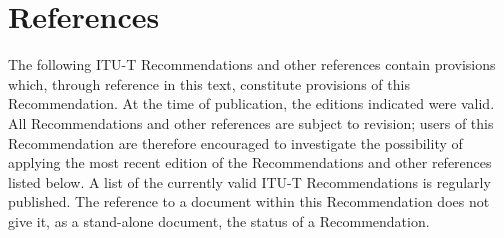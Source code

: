 \documentclass[a4paper,11pt]{article}
\begin{document}
\section{References}
The following ITU-T Recommendations and other references contain
provisions which, through reference in this text, constitute provisions
of this Recommendation.  At the time of publication, the editions
indicated were valid.  All Recommendations and other references are
subject to revision; users of this Recommendation are therefore encouraged
to investigate the possibility of applying the most recent edition of the
Recommendations and other references listed below.  A list of the
currently valid ITU-T Recommendations is regularly published.  The
reference to a document within this Recommendation does not give it, as a
stand-alone document, the status of a Recommendation.
\end{document}
